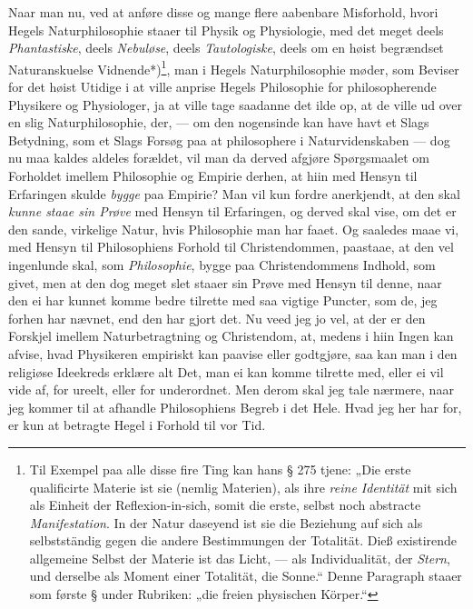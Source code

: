 \documentclass[12pt,a4paper]{book}
\newcommand{\apage}[1]{\marginnote{\footnotesize\textit{[#1]}}}
\begin{document}
Naar man nu, ved at anføre disse og mange flere aabenbare Misforhold, hvori
Hegels Naturphilosophie staaer til Physik og Physiologie, med det meget
deels \emph{Phantastiske}, deels \emph{Nebuløse}, deels \emph{Tautologiske},
deels om en høist begrændset Naturanskuelse
Vidnende*)\footnote{Til Exempel paa alle disse fire Ting kan hans § 275
tjene: „Die erste qualificirte Materie ist sie (nemlig Materien), als ihre
\emph{reine Identität} mit sich als Einheit der Reflexion-in-sich, somit die erste,
selbst noch abstracte \emph{Manifestation}. In der Natur daseyend ist sie die
Beziehung auf sich als selbstständig gegen die andere Bestimmungen der
Totalität. Dieß existirende allgemeine Selbst der Materie ist das Licht, ---
als Individualität, der \emph{Stern}, und derselbe als Moment einer Totalität, die
Sonne.“ Denne Paragraph staaer som første § under Rubriken: „die freien
physischen Körper.“}, man i Hegels Naturphilosophie møder, som Beviser for
det høist Utidige i at ville anprise Hegels Philosophie for philosopherende
Physikere og Physiologer, ja at ville tage saadanne det ilde op, at de ville
ud over en slig Naturphilosophie, der, --- om den nogensinde kan have havt
et Slags Betydning, som et Slags Forsøg paa at philosophere i
Naturvidenskaben --- dog nu maa kaldes aldeles forældet, vil man da derved
afgjøre Spørgsmaalet om Forholdet imellem Philosophie og Empirie derhen, at
hiin med Hensyn til Erfaringen skulde \emph{bygge} paa Empirie? Man vil kun fordre
anerkjendt, at den skal \emph{kunne staae sin Prøve} med Hensyn til Erfaringen, og
derved skal vise, om det er den sande, virkelige Natur, hvis Philosophie man
har faaet. Og saaledes maae vi, med Hensyn til Philosophiens Forhold til
\apage{25} Christendommen, paastaae, at den vel ingenlunde skal, som \emph{Philosophie}, bygge
paa Christendommens Indhold, som givet, men at den dog meget slet staaer sin
Prøve med Hensyn til denne, naar den ei har kunnet komme bedre tilrette med
saa vigtige Puncter, som de, jeg forhen har nævnet, end den har gjort det.
Nu veed jeg jo vel, at der er den Forskjel imellem Naturbetragtning og
Christendom, at, medens i hiin Ingen kan afvise, hvad Physikeren empiriskt
kan paavise eller godtgjøre, saa kan man i den religiøse Ideekreds erklære
alt Det, man ei kan komme tilrette med, eller ei vil vide af, for ureelt,
eller for underordnet. Men derom skal jeg tale nærmere, naar jeg kommer til
at afhandle Philosophiens Begreb i det Hele. Hvad jeg her har for, er kun at
betragte Hegel i Forhold til vor Tid.
\end{document}
